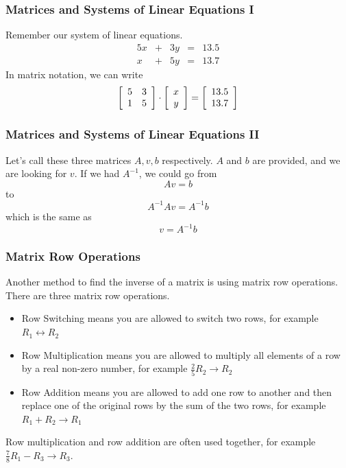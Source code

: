 \documentclass[xcolor=dvipsnames]{beamer}
\begin{document}
\begin{frame}
  \frametitle{Matrices and Systems of Linear Equations I}
Remember our system of linear equations. 
  \begin{equation}
    \label{eq:ahgohcoh}
    \begin{array}{rcrcl}
      5x & + & 3y & = & 13.5 \\
      x  & + & 5y & = & 13.7
    \end{array}
  \end{equation}
In matrix notation, we can write
  \begin{equation}
    \label{eq:neithohn}
  \left[\begin{array}{cc}
5        & 3                 \\
 1       & 5
  \end{array}\right]\cdot
  \left[\begin{array}{c}
 x                 \\
 y
  \end{array}\right]=
  \left[\begin{array}{c}
13.5                 \\
13.7
  \end{array}\right]\notag
  \end{equation}
\end{frame}

\begin{frame}
  \frametitle{Matrices and Systems of Linear Equations II}
Let's call these three matrices $A,v,b$ respectively. $A$ and $b$ are
provided, and we are looking for $v$. If we had $A^{-1}$, we could go
from
\begin{equation}
  \label{eq:baixieda}
  Av=b
\end{equation}
to
\begin{equation}
  \label{eq:maethung}
  A^{-1}Av=A^{-1}b
\end{equation}
which is the same as
\begin{equation}
  \label{eq:leighuga}
  v=A^{-1}b
\end{equation}
\end{frame}

\begin{frame}
  \frametitle{Matrix Row Operations}
  Another method to find the inverse of a matrix is using
  \alert{matrix row operations}. There are three matrix row
  operations.
\begin{itemize}
\item \alert{Row Switching} means you are allowed to switch two rows,
  for example $R_{1}\leftrightarrow{}R_{2}$
\item \alert{Row Multiplication} means you are allowed to multiply all
  elements of a row by a real non-zero number, for example
  $\frac{2}{5}R_{2}\rightarrow{}R_{2}$
\item \alert{Row Addition} means you are allowed to add one row to
  another and then replace one of the original rows by the sum of the
  two rows, for example $R_{1}+R_{2}\rightarrow{}R_{1}$
\end{itemize}
Row multiplication and row addition are often used together, for
example $\frac{7}{8}R_{1}-R_{3}\rightarrow{}R_{3}$.
\end{frame}
\end{document}
